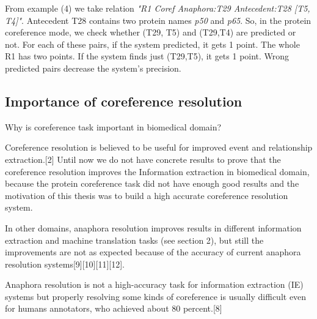 From example (4) we take relation \emph{"R1 Coref Anaphora:T29 Antecedent:T28 [T5, T4]"}. Antecedent T28 contains two protein names \emph{p50} and \emph{p65}. So, in the protein coreference mode, we check whether (T29, T5) and (T29,T4) are predicted or not. For each of these pairs, if the system predicted, it gets 1 point. The whole R1 has two points. If the system finds just (T29,T5), it gets 1 point. Wrong predicted pairs decrease the system's precision. 

\subsection{Importance of coreference resolution}

Why is coreference task important in biomedical domain?

Coreference resolution is believed to be useful for improved event and relationship extraction.[2] Until now we do not have concrete results to prove that the coreference resolution improves the Information extraction in biomedical domain, because the protein coreference task did not have enough good results and the motivation of this thesis was to build a high accurate coreference resolution system.
 
In other domains, anaphora resolution improves results in different information extraction and machine translation tasks (see section 2), but still the improvements are not as expected because of the accuracy of current anaphora resolution systems[9][10][11][12].
 
Anaphora resolution is not a high-accuracy task for information extraction (IE) systems but properly resolving some kinds of coreference is usually difficult even for humans annotators, who achieved about 80 percent.[8]


